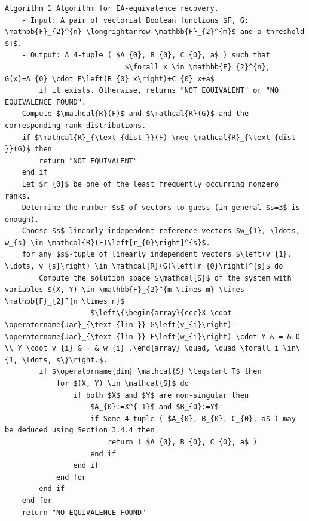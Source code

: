 \documentclass[10pt]{article}
\begin{document}
\begin{verbatim}
Algorithm 1 Algorithm for EA-equivalence recovery.
    - Input: A pair of vectorial Boolean functions $F, G: \mathbb{F}_{2}^{n} \longrightarrow \mathbb{F}_{2}^{m}$ and a threshold $T$.
    - Output: A 4-tuple ( $A_{0}, B_{0}, C_{0}, a$ ) such that
                            $\forall x \in \mathbb{F}_{2}^{n}, G(x)=A_{0} \cdot F\left(B_{0} x\right)+C_{0} x+a$
        if it exists. Otherwise, returns "NOT EQUIVALENT" or "NO EQUIVALENCE FOUND".
    Compute $\mathcal{R}(F)$ and $\mathcal{R}(G)$ and the corresponding rank distributions.
    if $\mathcal{R}_{\text {dist }}(F) \neq \mathcal{R}_{\text {dist }}(G)$ then
        return "NOT EQUIVALENT"
    end if
    Let $r_{0}$ be one of the least frequently occurring nonzero ranks.
    Determine the number $s$ of vectors to guess (in general $s=3$ is enough).
    Choose $s$ linearly independent reference vectors $w_{1}, \ldots, w_{s} \in \mathcal{R}(F)\left[r_{0}\right]^{s}$.
    for any $s$-tuple of linearly independent vectors $\left(v_{1}, \ldots, v_{s}\right) \in \mathcal{R}(G)\left[r_{0}\right]^{s}$ do
        Compute the solution space $\mathcal{S}$ of the system with variables $(X, Y) \in \mathbb{F}_{2}^{m \times m} \times \mathbb{F}_{2}^{n \times n}$
                    $\left\{\begin{array}{ccc}X \cdot \operatorname{Jac}_{\text {lin }} G\left(v_{i}\right)-\operatorname{Jac}_{\text {lin }} F\left(w_{i}\right) \cdot Y & = & 0 \\ Y \cdot v_{i} & = & w_{i} .\end{array} \quad, \quad \forall i \in\{1, \ldots, s\}\right.$.
        if $\operatorname{dim} \mathcal{S} \leqslant T$ then
            for $(X, Y) \in \mathcal{S}$ do
                if both $X$ and $Y$ are non-singular then
                    $A_{0}:=X^{-1}$ and $B_{0}:=Y$
                    if Some 4-tuple ( $A_{0}, B_{0}, C_{0}, a$ ) may be deduced using Section 3.4.4 then
                        return ( $A_{0}, B_{0}, C_{0}, a$ )
                    end if
                end if
            end for
        end if
    end for
    return "NO EQUIVALENCE FOUND"
\end{verbatim}
\end{document}
